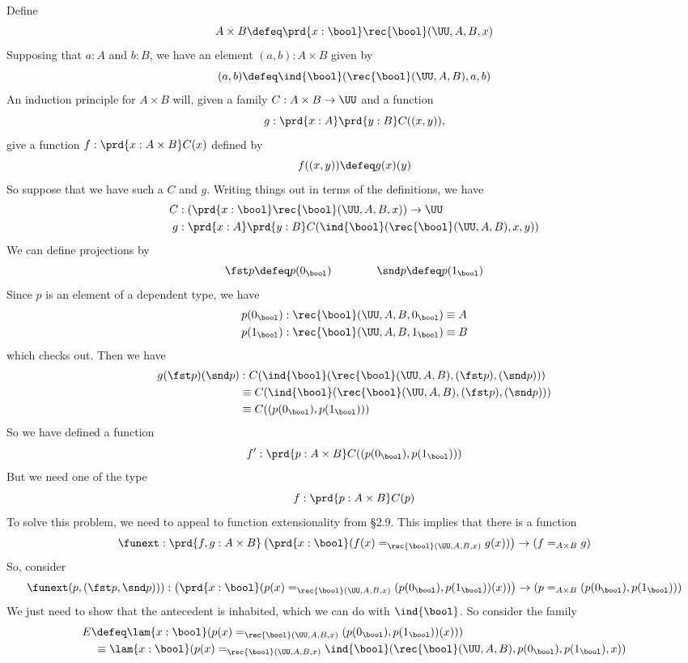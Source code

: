 \soln Define
\[
  A \times B \defeq \prd{x : \bool} \rec{\bool}(\UU, A, B, x)
\]
Supposing that $a : A$ and $b : B$, we have an element $(a, b) : A \times B$
given by
\[
  (a, b) \defeq \ind{\bool}(\rec{\bool}(\UU, A, B), a, b)
\]
An induction principle for $A \times B$ will, given a family $C : A \times B
\to \UU$ and a function 
\[
  g : \prd{x:A}\prd{y:B} C((x, y)),
\] 
give a function $f : \prd{x : A \times B}C(x)$ defined by
\[
  f((x, y)) \defeq g(x)(y)
\]
So suppose that we have such a $C$ and $g$.  Writing things out in terms of the
definitions, we have
\begin{align*}
  C &: \left(\prd{x:\bool}\rec{\bool}(\UU, A, B, x)\right) \to \UU \\
  g &: \prd{x:A}\prd{y:B} C(\ind{\bool}(\rec{\bool}(\UU, A, B), x, y))
\end{align*}  
We can define projections by
\[
  \fst p \defeq p(0_{\bool}) \qquad\qquad \snd p \defeq p(1_{\bool})
\]
Since $p$ is an element of a dependent type, we have
\begin{align*}
  p(0_{\bool}) &: \rec{\bool}(\UU, A, B, 0_{\bool}) \equiv A\\
  p(1_{\bool}) &: \rec{\bool}(\UU, A, B, 1_{\bool}) \equiv B
\end{align*}
which checks out.  Then we have
\begin{align*}
  g(\fst p)(\snd p) 
  &: C(\ind{\bool}(\rec{\bool}(\UU, A, B), (\fst p), (\snd p)))
  \\&\equiv 
  C(\ind{\bool}(\rec{\bool}(\UU, A, B), (\fst p), (\snd p)))
  \\&\equiv 
  C((p(0_{\bool}), p(1_{\bool})))
\end{align*}
So we have defined a function
\[
  f' : \prd{p : A \times B} C((p(0_{\bool}), p(1_{\bool})))
\]
But we need one of the type
\[
  f : \prd{p : A \times B} C(p)
\]
To solve this problem, we need to appeal to function extensionality from \S2.9.
This implies that there is a function
\[
  \funext : 
  \prd{f, g : A \times B} 
    \left(\prd{x:\bool} (f(x) =_{\rec{\bool}(\UU, A, B, x)} g(x))\right)
    \to 
    (f =_{A \times B} g)
\]
So, consider
\[
  \funext(p, (\fst p, \snd p))) 
  :
  \left(\prd{x:\bool} (p(x) =_{\rec{\bool}(\UU, A, B, x)} (p(0_{\bool}),
    p(1_{\bool}))(x))\right)
  \to 
  (p =_{A \times B} (p(0_{\bool}), p(1_{\bool})))
\]
We just need to show that the antecedent is inhabited, which we can do with
$\ind{\bool}$.  So consider the family
\begin{align*}
  E &\defeq 
  \lam{x : \bool} 
  (p(x) =_{\rec{\bool}(\UU, A, B, x)} (p(0_{\bool}), p(1_{\bool}))(x)))
  \\&\phantom{:}\equiv
  \lam{x : \bool} 
  (p(x) =_{\rec{\bool}(\UU, A, B, x)} \ind{\bool}(\rec{\bool}(\UU, A, B),
  p(0_{\bool}), p(1_{\bool}), x))
\end{align*}
